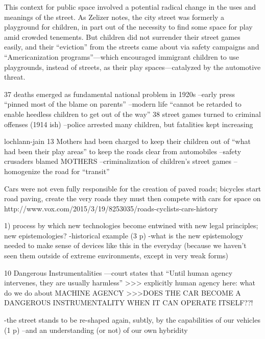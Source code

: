 This context for public space involved a potential radical change in
the uses and meanings of the street. As Zelizer notes, the city street
was formerly a playground for children, in part out of the necessity
to find some space for play amid crowded tenements\cite[p.
  33]{???-zelizer}. But children did not surrender their street games
easily, and their ``eviction'' from the streets came about via safety
campaigns and ``Americanization programs''---which encouraged
immigrant children to use playgrounds, instead of streets, as their
play spaces---catalyzed by the automotive threat\cite[p.
  35]{???-zelizer}. 

37 deaths emerged as fundamental national problem in 1920s
--early press ``pinned most of the blame on parents''
--modern life ``cannot be retarded to enable heedless children to get
out of the way''
38 street games turned to criminal offenses (1914 ish)
--police arrested many children, but fatalities kept increasing

lochlann-jain
13 Mothers had been charged to keep their children out of ``what had
been their play areas'' to keep the roads clear from automobiles
--safety crusaders blamed MOTHERS
--criminalization of children's street games
--homogenize the road for ``transit''

Cars were not even fully responsible for the creation of paved roads;
bicycles start road paving, create the very roads they must then
compete with cars for space on
http://www.vox.com/2015/3/19/8253035/roads-cyclists-cars-history


1) process by which new technologies become entwined with new legal
principles; new epistemologies?
-historical example (3 p)
-what is the new epistemology needed to make sense of devices like
this in the everyday (because we haven't seen them outside of extreme
environments, except in very weak forms)

10 Dangerous Instrumentalities
---court states that ``Until human agency intervenes, they are usually
harmless''
>>> explicitly human agency here: what do we do about MACHINE AGENCY
>>>DOES THE CAR BECOME A DANGEROUS INSTRUMENTALITY WHEN IT CAN OPERATE ITSELF??!


-the street stands to be re-shaped again, subtly, by the capabilities
of our vehicles (1 p)
--and an understanding (or not) of our own hybridity

